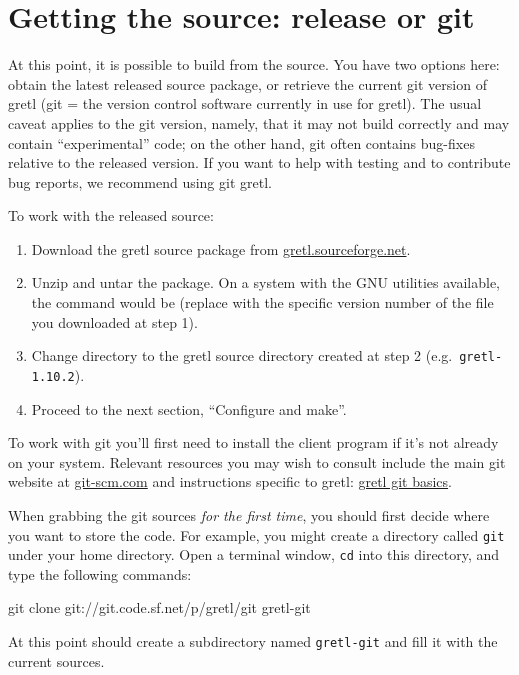 \section{Getting the source: release or git}

At this point, it is possible to build from the source.  You have two
options here: obtain the latest released source package, or retrieve
the current git version of gretl (git = the version control software
currently in use for gretl).  The usual caveat applies to the git
version, namely, that it may not build correctly and may contain
``experimental'' code; on the other hand, git often contains bug-fixes
relative to the released version.  If you want to help with testing
and to contribute bug reports, we recommend using git gretl.

To work with the released source:
\begin{enumerate}
\item Download the gretl source package from
  \href{http://gretl.sourceforge.net/}{gretl.sourceforge.net}.
\item Unzip and untar the package.  On a system with the GNU utilities
  available, the command would be 
  (replace  with the specific version number of the file you
  downloaded at step 1).
\item Change directory to the gretl source directory created at step 2
  (e.g.\ \verb+gretl-1.10.2+).
\item Proceed to the next section, ``Configure and make''.
\end{enumerate}

To work with git you'll first need to install the  client
program if it's not already on your system.  Relevant resources you
may wish to consult include the main git website at
\href{https://git-scm.com/}{git-scm.com} and instructions specific to
gretl:
\href{http://gretl.sourceforge.net/gretl-git-basics.html}{gretl
  git basics}.

When grabbing the git sources \textit{for the first time}, you should
first decide where you want to store the code.  For example, you might
create a directory called \texttt{git} under your home directory.
Open a terminal window, \texttt{cd} into this directory, and type
the following commands:
%
\begin{code}
git clone git://git.code.sf.net/p/gretl/git gretl-git
\end{code}
%
At this point  should create a subdirectory named
\texttt{gretl-git} and fill it with the current sources.

